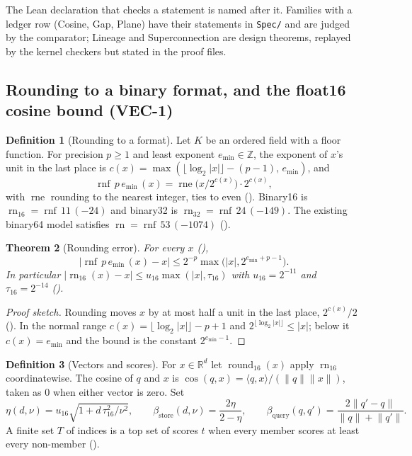 \documentclass[11pt]{article}
\theoremstyle{plain}
\newtheorem{theorem}{Theorem}[section]
\theoremstyle{definition}
\newtheorem{definition}[theorem]{Definition}
\theoremstyle{remark}
\newcommand{\rn}{\operatorname{rn}}
\newcommand{\rnf}{\operatorname{rnf}}
\newcommand{\cosine}{\operatorname{cos}}
\newcommand{\norm}[1]{\lVert #1 \rVert}
\newcommand{\abs}[1]{\lvert #1 \rvert}
\newcommand{\inner}[2]{\langle #1, #2 \rangle}
\newcommand{\betaS}{\beta_{\mathrm{store}}}
\newcommand{\betaQ}{\beta_{\mathrm{query}}}
\begin{document}
The Lean declaration that checks a statement is named after it. Families with a ledger row
(Cosine, Gap, Plane) have their statements in \texttt{Spec/} and are judged by the comparator;
Lineage and Superconnection are design theorems, replayed by the kernel checkers but stated in the
proof files.

\subsection{Rounding to a binary format, and the float16 cosine bound (VEC-1)}

\begin{definition}[Rounding to a format]
Let $K$ be an ordered field with a floor function. For precision $p \ge 1$ and least exponent
$e_{\min} \in \mathbb{Z}$, the exponent of $x$'s unit in the last place is
$c(x) = \max(\lfloor \log_2 \abs{x} \rfloor - (p - 1),\, e_{\min})$, and
\[
  \rnf\,p\,e_{\min}\,(x) = \operatorname{rne}\bigl(x / 2^{c(x)}\bigr)\cdot 2^{c(x)},
\]
with $\operatorname{rne}$ rounding to the nearest integer, ties to even
(). Binary16 is $\rn_{16} = \rnf\,11\,(-24)$ and binary32 is
$\rn_{32} = \rnf\,24\,(-149)$. The existing binary64 model satisfies
$\rn = \rnf\,53\,(-1074)$ ().
\end{definition}

\begin{theorem}[Rounding error]\label{thm:rnf}
For every $x$ (),
\[
  \abs{\rnf\,p\,e_{\min}\,(x) - x} \le 2^{-p}\max\bigl(\abs{x}, 2^{e_{\min}+p-1}\bigr).
\]
In particular $\abs{\rn_{16}(x) - x} \le u_{16}\max(\abs{x}, \tau_{16})$ with $u_{16} = 2^{-11}$
and $\tau_{16} = 2^{-14}$ ().
\end{theorem}

\begin{proof}[Proof sketch]
Rounding moves $x$ by at most half a unit in the last place,
$2^{c(x)}/2$ (). In the normal range $c(x) = \lfloor \log_2
\abs{x} \rfloor - p + 1$ and $2^{\lfloor \log_2 \abs{x} \rfloor} \le \abs{x}$; below it
$c(x) = e_{\min}$ and the bound is the constant $2^{e_{\min}-1}$.
\end{proof}

\begin{definition}[Vectors and scores]
For $x \in \mathbb{R}^d$ let $\operatorname{round}_{16}(x)$ apply $\rn_{16}$ coordinatewise. The
cosine of $q$ and $x$ is $\cosine(q, x) = \inner{q}{x}/(\norm{q}\norm{x})$, taken as $0$ when
either vector is zero. Set
\[
  \eta(d, \nu) = u_{16}\sqrt{1 + d\,\tau_{16}^2/\nu^2},\qquad
  \betaS(d, \nu) = \frac{2\eta}{2 - \eta},\qquad
  \betaQ(q, q') = \frac{2\norm{q' - q}}{\norm{q} + \norm{q'}}.
\]
A finite set $T$ of indices is a top set of scores $t$ when every member scores at least every
non-member ().
\end{definition}
\end{document}
